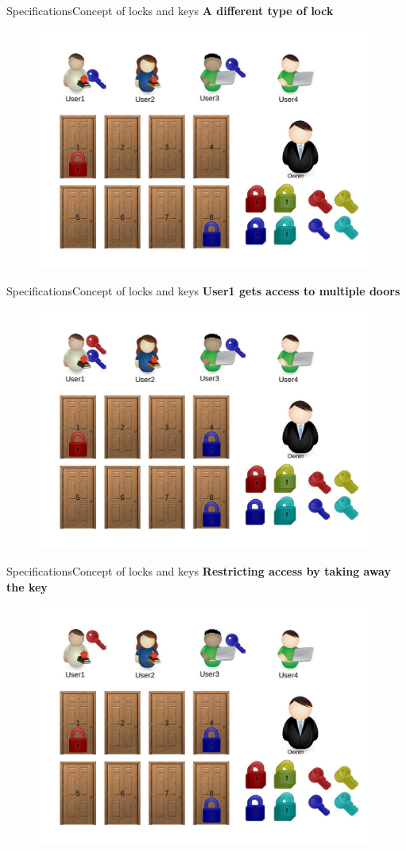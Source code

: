 \documentclass[xcolor=table]{beamer}
\begin{document}
\begin{frame}{Specifications}{Concept of locks and keys}
	\textbf{A different type of lock}
	\begin{figure}
		\centering
		\includegraphics[width=0.7\linewidth]{./media/5}
		\label{fig:5}
	\end{figure}
\end{frame}

\begin{frame}{Specifications}{Concept of locks and keys}
	\textbf{User1 gets access to multiple doors}
	\begin{figure}
		\centering
		\includegraphics[width=0.7\linewidth]{./media/6}
		\label{fig:6}
	\end{figure}
\end{frame}

\begin{frame}{Specifications}{Concept of locks and keys}
	\textbf{Restricting access by taking away the key}
	\begin{figure}
		\centering
		\includegraphics[width=0.7\linewidth]{./media/7}
		\label{fig:7}
	\end{figure}
\end{frame}
\end{document}
